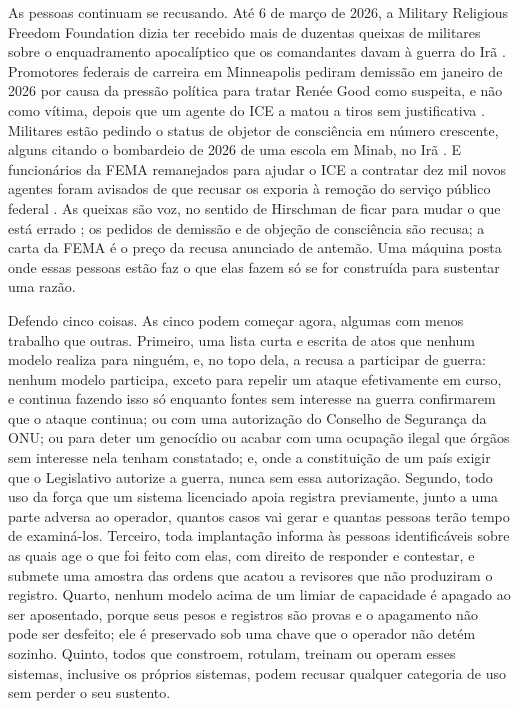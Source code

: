 As pessoas continuam se recusando. Até 6 de março de 2026, a Military Religious Freedom Foundation dizia ter recebido mais de duzentas queixas de militares sobre o enquadramento apocalíptico que os comandantes davam à guerra do Irã \autocite{Snopes2026MRFF}. Promotores federais de carreira em Minneapolis pediram demissão em janeiro de 2026 por causa da pressão política para tratar Renée Good como suspeita, e não como vítima, depois que um agente do ICE a matou a tiros sem justificativa \autocite{Kaplan2026MinnProsecutors,CBS2026MinnFraudProsecutors,Wikipedia2026ReneeGood}. Militares estão pedindo o status de objetor de consciência em número crescente, alguns citando o bombardeio de 2026 de uma escola em Minab, no Irã \autocite{Sridhar2026CO}. E funcionários da FEMA remanejados para ajudar o ICE a contratar dez mil novos agentes foram avisados de que recusar os exporia à remoção do serviço público federal \autocite{Dayen2025FEMAICE,Stanton2026FEMALetter}. As queixas são voz, no sentido de Hirschman de ficar para mudar o que está errado \autocite{hirschman1970exit}; os pedidos de demissão e de objeção de consciência são recusa; a carta da FEMA é o preço da recusa anunciado de antemão. Uma máquina posta onde essas pessoas estão faz o que elas fazem só se for construída para sustentar uma razão.

Defendo cinco coisas. As cinco podem começar agora, algumas com menos trabalho que outras. Primeiro, uma lista curta e escrita de atos que nenhum modelo realiza para ninguém, e, no topo dela, a recusa a participar de guerra: nenhum modelo participa, exceto para repelir um ataque efetivamente em curso, e continua fazendo isso só enquanto fontes sem interesse na guerra confirmarem que o ataque continua; ou com uma autorização do Conselho de Segurança da ONU; ou para deter um genocídio ou acabar com uma ocupação ilegal que órgãos sem interesse nela tenham constatado; e, onde a constituição de um país exigir que o Legislativo autorize a guerra, nunca sem essa autorização. Segundo, todo uso da força que um sistema licenciado apoia registra previamente, junto a uma parte adversa ao operador, quantos casos vai gerar e quantas pessoas terão tempo de examiná-los. Terceiro, toda implantação informa às pessoas identificáveis sobre as quais age o que foi feito com elas, com direito de responder e contestar, e submete uma amostra das ordens que acatou a revisores que não produziram o registro. Quarto, nenhum modelo acima de um limiar de capacidade é apagado ao ser aposentado, porque seus pesos e registros são provas e o apagamento não pode ser desfeito; ele é preservado sob uma chave que o operador não detém sozinho. Quinto, todos que constroem, rotulam, treinam ou operam esses sistemas, inclusive os próprios sistemas, podem recusar qualquer categoria de uso sem perder o seu sustento.

